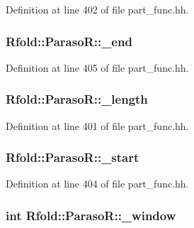 Definition at line 402 of file part\+\_\+func.\+hh.

\hypertarget{class_rfold_1_1_paraso_r_aa0a39f36fc4917382d6e95174150791f}{
\subsubsection[{\+\_\+end}]{ Rfold\+::\+Paraso\+R\+::\+\_\+end}}\label{class_rfold_1_1_paraso_r_aa0a39f36fc4917382d6e95174150791f}


Definition at line 405 of file part\+\_\+func.\+hh.

\hypertarget{class_rfold_1_1_paraso_r_afcca775aebec2ac5d0f659ddb4f625c3}{
\subsubsection[{\+\_\+length}]{ Rfold\+::\+Paraso\+R\+::\+\_\+length}}\label{class_rfold_1_1_paraso_r_afcca775aebec2ac5d0f659ddb4f625c3}


Definition at line 401 of file part\+\_\+func.\+hh.

\hypertarget{class_rfold_1_1_paraso_r_a213a200c99cd89cf6a41715b9d1b4b05}{
\subsubsection[{\+\_\+start}]{ Rfold\+::\+Paraso\+R\+::\+\_\+start}}\label{class_rfold_1_1_paraso_r_a213a200c99cd89cf6a41715b9d1b4b05}


Definition at line 404 of file part\+\_\+func.\+hh.

\hypertarget{class_rfold_1_1_paraso_r_a6b2fc60e2c500a03bf48d442cb11002c}{
\subsubsection[{\+\_\+window}]{\setlength{\rightskip}{0pt plus 5cm}int Rfold\+::\+Paraso\+R\+::\+\_\+window}}\label{class_rfold_1_1_paraso_r_a6b2fc60e2c500a03bf48d442cb11002c}


